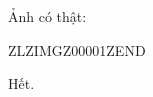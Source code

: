 \documentclass[12pt]{article}
\begin{document}
Ảnh có thật:



ZLZIMGZ00001ZEND



Hết.
\end{document}
